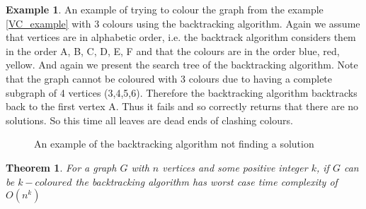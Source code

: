 \documentclass{report}
\theoremstyle{plain}
\newtheorem{theorem}{Theorem}
\theoremstyle{definition}
\newtheorem{example}{Example}
\theoremstyle{remark}
\numberwithin{definition}{chapter}
\numberwithin{example}{chapter}
\numberwithin{figure}{chapter}
\numberwithin{theorem}{chapter}
\numberwithin{lemma}{chapter}
\begin{document}
\begin{example}

An example of trying to colour the graph from the example \ref{VC_example} with 3 colours using the backtracking algorithm. Again we assume that vertices are in alphabetic order, i.e. the backtrack algorithm considers them in the order A, B, C, D, E, F and that the colours are in the order blue, red, yellow. And again we present the search tree of the backtracking algorithm. Note that the graph cannot be coloured with 3 colours due to having a complete subgraph of 4 vertices (3,4,5,6). Therefore the backtracking algorithm backtracks back to the first vertex A. Thus it fails and so correctly returns that there are no solutions. So this time all leaves are dead ends of clashing colours.

\begin{figure}[h]


\center
{}
\caption{An example of the backtracking algorithm not finding a solution}
\end{figure}
\end{example}

\begin{theorem}
For a graph $G$ with $n$ vertices and some positive integer $k$, if $G$ can be $k-coloured$ the backtracking algorithm has worst case time complexity of $O(n^k)$
\label{BT_wc}
\end{theorem}
\end{document}
